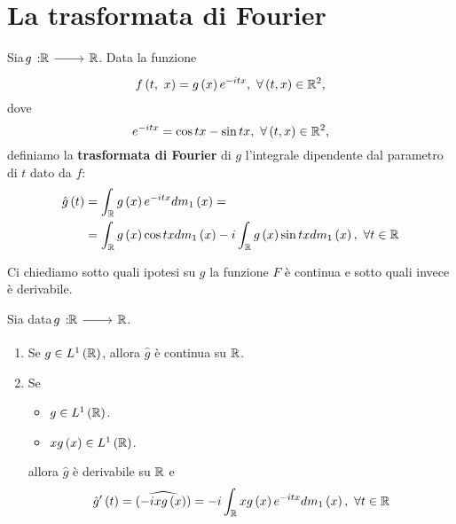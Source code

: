 \section{La trasformata di Fourier}
\begin{define}
	Sia $\funz{g}{\realset}{\realset}$. Data la funzione
	\begin{equation*}
		f\left(t,\ x\right)=g\left(x\right)e^{-itx},\ \forall \left(t,x\right)\in\mathbb{R}^2,
	\end{equation*}
	dove
	\begin{equation*}
		e^{-itx}=\cos tx-\sin tx,\ \forall\left(t,x\right)\in\realset^2,
	\end{equation*}
	definiamo la \textbf{trasformata di Fourier} di $g$ l'integrale dipendente dal parametro di $t$ dato da $f$:
	\begin{align}
		\hat{g}\left(t\right)&=\int_{\mathbb{R}}g\left(x\right)e^{-itx}dm_1\left(x\right)=\\
		&=\int_{\mathbb{R}}g\left(x\right)\cos txdm_1\left(x\right)-i\int_{\mathbb{R}} g\left(x\right)\sin txdm_1\left(x\right),\ \forall t\in\mathbb{R}
	\end{align}
\end{define}
Ci chiediamo sotto quali ipotesi su $g$ la funzione $F$ è continua e sotto quali invece è derivabile.
\begin{theorema}
	Sia data $\funz{g}{\realset}{\realset}$.
	\begin{enumerate}
		\item Se $g\in L^1\left(\mathbb{R}\right)$, allora $\hat{g}$ è continua su $\mathbb{R}$.
		\item Se
		\begin{itemize}
			\item $g\in L^1\left(\mathbb{R}\right)$.
			\item $xg\left(x\right)\in L^1\left(\mathbb{R}\right)$.
		\end{itemize}
		allora $\hat{g}$ è derivabile su $\mathbb{R}$ e
		\begin{equation}
			\hat{g}'\left(t\right)=\widehat{\left(-ixg\left(x\right)\right)}=-i\int_{\realset}xg\left(x\right)e^{-itx}dm_1\left(x\right),\ \forall t\in\realset
		\end{equation}
	\end{enumerate}
\end{theorema}
